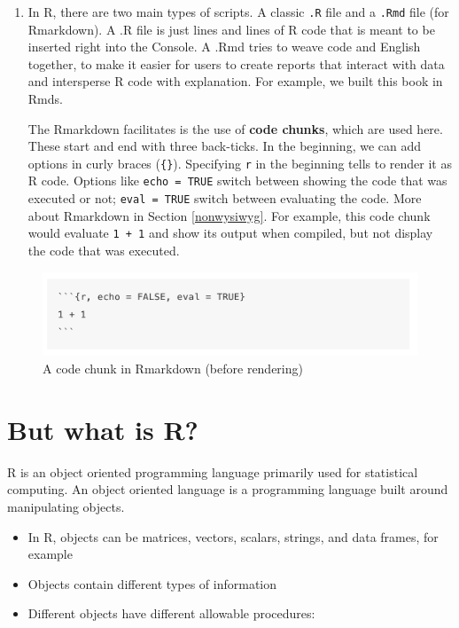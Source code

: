 \documentclass[]{book}
\providecommand{\tightlist}{%
  \setlength{\itemsep}{0pt}\setlength{\parskip}{0pt}}
\theoremstyle{definition}
\theoremstyle{definition}
\theoremstyle{definition}
\theoremstyle{remark}
\begin{document}
\begin{enumerate}
\def\labelenumi{\arabic{enumi}.}
\setcounter{enumi}{4}
\item
  In R, there are two main types of scripts. A classic \texttt{.R} file
  and a \texttt{.Rmd} file (for Rmarkdown). A .R file is just lines and
  lines of R code that is meant to be inserted right into the Console. A
  .Rmd tries to weave code and English together, to make it easier for
  users to create reports that interact with data and intersperse R code
  with explanation. For example, we built this book in Rmds.

  The Rmarkdown facilitates is the use of \textbf{code chunks}, which
  are used here. These start and end with three back-ticks. In the
  beginning, we can add options in curly braces (\texttt{\{\}}).
  Specifying \texttt{r} in the beginning tells to render it as R code.
  Options like \texttt{echo\ =\ TRUE} switch between showing the code
  that was executed or not; \texttt{eval\ =\ TRUE} switch between
  evaluating the code. More about Rmarkdown in Section \ref{nonwysiwyg}.
  For example, this code chunk would evaluate \texttt{1\ +\ 1} and show
  its output when compiled, but not display the code that was executed.
\end{enumerate}

\begin{figure}
\centering
\includegraphics{images/11_4_codechunk.png}
\caption{A code chunk in Rmarkdown (before rendering)}
\end{figure}

\newpage

\section{But what is R?}\label{but-what-is-r}

R is an object oriented programming language primarily used for
statistical computing. An object oriented language is a programming
language built around manipulating objects.

\begin{itemize}
\tightlist
\item
  In R, objects can be matrices, vectors, scalars, strings, and data
  frames, for example
\item
  Objects contain different types of information
\item
  Different objects have different allowable procedures:
\end{itemize}
\end{document}
